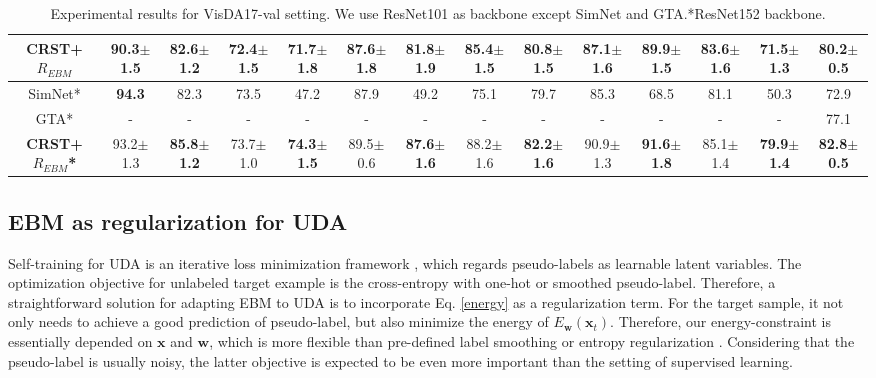 \documentclass[a4paper,conference]{IEEEtran}
\theoremstyle{plain}%
\begin{document}
\begin{table*}[t]
{\begin{tabular}{c|cccccccccccc|c}
\hline

\textbf{CRST+$R_{EBM}$} & \textbf{90.3}$\pm$1.5 & \textbf{82.6$\pm$1.2} & 72.4$\pm$1.5 & \textbf{71.7$\pm$1.8} & 87.6$\pm$1.8& \textbf{81.8$\pm$1.9} & 85.4$\pm$1.5 & \textbf{80.8$\pm$1.5} & 87.1$\pm$1.6 & \textbf{89.9$\pm$1.5} & 83.6$\pm$1.6 & \textbf{71.5$\pm$1.3 }& \textbf{80.2$\pm$0.5}\\

\hline
\hline

SimNet* \cite{pinheiro2018unsupervised} & \textbf{94.3} & 82.3 & 73.5 & 47.2 & 87.9 & 49.2 & 75.1 & 79.7 & 85.3 & 68.5 & 81.1 & 50.3 & 72.9 \\

GTA* \cite{sankaranarayanan2018generate}  
& - & - & - & - & - & - & - & - & - & - & - & - & 77.1\\\hline
\textbf{CRST+$R_{EBM}$* }& {93.2$\pm$1.3} & \textbf{85.8$\pm$1.2} &  {73.7$\pm$1.0 }& \textbf{74.3$\pm$1.5 }& {89.5$\pm$0.6} & \textbf{87.6$\pm$1.6} &  {88.2$\pm$1.6 }& \textbf{82.2$\pm$1.6 }&  {90.9$\pm$1.3} & \textbf{91.6$\pm$1.8} & {85.1$\pm$1.4} & \textbf{79.9$\pm$1.4} & \textbf{82.8$\pm$0.5 }\\
\hline

\end{tabular}%
}
\caption{Experimental results for VisDA17-val setting. We use ResNet101 as backbone except SimNet and GTA.*ResNet152 backbone.}
\label{table:visda17}
\end{table*}











\subsection{EBM as regularization for UDA}


Self-training for UDA is an iterative loss minimization framework \cite{zou2019confidence}, which regards pseudo-labels as learnable latent variables. The optimization objective for unlabeled target example is the cross-entropy with one-hot \cite{Zou_2018_ECCV} or smoothed \cite{zou2019confidence} pseudo-label. Therefore, a straightforward solution for adapting EBM to UDA is to incorporate Eq. \ref{energy} as a regularization term. For the target sample, it not only needs to achieve a good prediction of pseudo-label, but also minimize the energy of $E_{\mathbf{w}}(\mathbf{x}_t)$. Therefore, our energy-constraint is essentially depended on $\mathbf{x}$ and $\mathbf{w}$, which is more flexible than pre-defined label smoothing or entropy regularization \cite{zou2019confidence}. Considering that the pseudo-label is usually noisy, the latter objective is expected to be even more important than the setting of supervised learning.      
\end{document}
